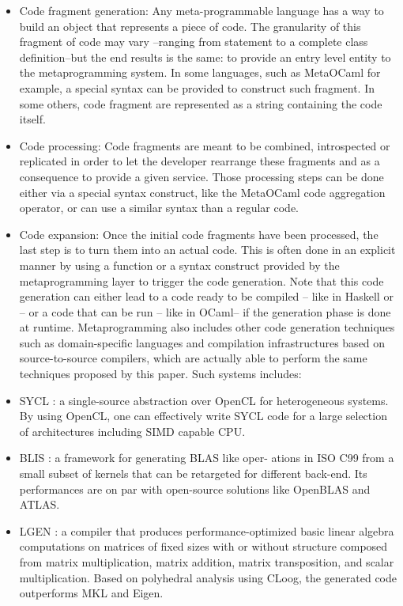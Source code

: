 \documentclass[../main]{subfiles}
\begin{document}
\begin{itemize}
\item Code fragment generation:
Any meta-programmable
language has a way to build an object that represents a
piece of code. The granularity of this fragment of code
may vary –ranging from statement to a complete class
definition–but the end results is the same: to provide
an entry level entity to the metaprogramming system.
In some languages, such as MetaOCaml for example,
a special syntax can be provided to construct such
fragment. In some others, code fragment are represented
as a string containing the code itself.

\item Code processing:
Code fragments are meant to
be combined, introspected or replicated in order to
let the developer rearrange these fragments and as a
consequence to provide a given service. Those processing
steps can be done either via a special syntax construct,
like the MetaOCaml code aggregation operator, or can
use a similar syntax than a regular code.

\item Code expansion:
Once the initial code fragments have
been processed, the last step is to turn them into an
actual code. This is often done in an explicit manner by
using a function or a syntax construct provided by the
metaprogramming layer to trigger the code generation.
Note that this code generation can either lead to a code
ready to be compiled – like in Haskell or \cpp– or a
code that can be run – like in OCaml– if the generation
phase is done at runtime.
Metaprogramming also includes other code generation
techniques such as domain-specific languages and compilation
infrastructures based on source-to-source compilers, which
are actually able to perform the same techniques proposed by
this paper. Such systems includes:

\item SYCL \cite{hpcs13}:
a single-source abstraction over OpenCL
for heterogeneous systems. By using OpenCL, one can
effectively write SYCL code for a large selection of
architectures including SIMD capable CPU.

\item BLIS \cite{hpcs14}:
a framework for generating BLAS like oper-
ations in ISO C99 from a small subset of kernels that can
be retargeted for different back-end. Its performances are
on par with open-source solutions like OpenBLAS and
ATLAS.

\item LGEN \cite{hpcs15}:
a compiler that produces performance-optimized
basic linear algebra computations on matrices
of fixed sizes with or without structure composed
from matrix multiplication, matrix addition, matrix
transposition, and scalar multiplication. Based on
polyhedral analysis using CLoog, the generated code
outperforms MKL and Eigen.
\end{itemize}
\end{document}
